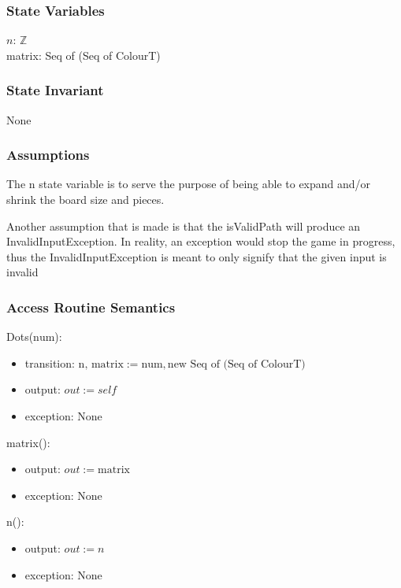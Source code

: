 \documentclass[12pt]{article}
\begin{document}
\subsubsection* {State Variables}

$n$: $\mathbb{Z}$\\
matrix: Seq of (Seq of ColourT)

\subsubsection* {State Invariant}

None

\subsubsection* {Assumptions}
The n state variable is to serve the purpose of being able to expand and/or shrink the board size and pieces. 

Another assumption that is made is that the isValidPath will produce an InvalidInputException.  In reality, an exception would stop the game in progress, thus the InvalidInputException is meant to only signify that the given input is invalid



\subsubsection* {Access Routine Semantics}

Dots($\mbox{num}$):
\begin{itemize}
\item transition: $\mbox{n, matrix} := \mbox{num}, \mbox{new Seq of (Seq of ColourT)} $
\item output: $out := \mathit{self}$
\item exception: None
\end{itemize}

\noindent matrix():
\begin{itemize}
\item output: $out := \mbox{matrix}$
\item exception: None
\end{itemize}

\noindent n():
\begin{itemize}
\item output: $out := n$
\item exception: None
\end{itemize}
\end{document}

